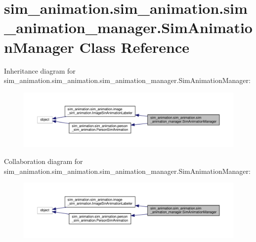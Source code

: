\hypertarget{classsim__animation_1_1sim__animation_1_1sim__animation__manager_1_1SimAnimationManager}{}\section{sim\+\_\+animation.\+sim\+\_\+animation.\+sim\+\_\+animation\+\_\+manager.\+Sim\+Animation\+Manager Class Reference}
\label{classsim__animation_1_1sim__animation_1_1sim__animation__manager_1_1SimAnimationManager}


Inheritance diagram for sim\+\_\+animation.\+sim\+\_\+animation.\+sim\+\_\+animation\+\_\+manager.\+Sim\+Animation\+Manager\+:
\nopagebreak
\begin{figure}[H]
\begin{center}
\leavevmode
\includegraphics[width=350pt]{classsim__animation_1_1sim__animation_1_1sim__animation__manager_1_1SimAnimationManager__inherit__graph}
\end{center}
\end{figure}


Collaboration diagram for sim\+\_\+animation.\+sim\+\_\+animation.\+sim\+\_\+animation\+\_\+manager.\+Sim\+Animation\+Manager\+:
\nopagebreak
\begin{figure}[H]
\begin{center}
\leavevmode
\includegraphics[width=350pt]{classsim__animation_1_1sim__animation_1_1sim__animation__manager_1_1SimAnimationManager__coll__graph}
\end{center}
\end{figure}
